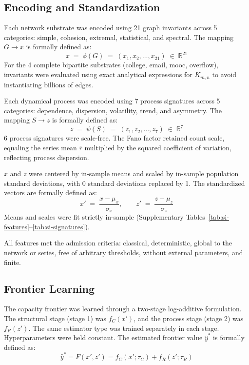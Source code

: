 \documentclass{article}
\begin{document}
\subsection*{Encoding and Standardization}
\label{sec:encoding}
Each network substrate was encoded using 21 graph invariants across 5 categories: simple, cohesion, extremal, statistical, and spectral. The mapping $G \to x$ is formally defined as:
\begin{equation}
    x \;=\; \phi(G) \;=\; (x_1, x_2, \ldots, x_{21}) \;\in\; \mathbb{R}^{21}
\label{eq:invariants}
\end{equation}
For the 4 complete bipartite substrates (college, email, mooc, overflow), invariants were evaluated using exact analytical expressions for $K_{m,n}$ to avoid instantiating billions of edges.

Each dynamical process was encoded using 7 process signatures across 5 categories: dependence, dispersion, volatility, trend, and asymmetry. The mapping $S \to z$ is formally defined as:
\begin{equation}
    z \;=\; \psi(S) \;=\; (z_1, z_2, \ldots, z_7) \;\in\; \mathbb{R}^{7}
\label{eq:signatures}
\end{equation}
6 process signatures were scale-free. The Fano factor retained count scale, equaling the series mean $\bar{r}$ multiplied by the squared coefficient of variation, reflecting process dispersion.

$x$ and $z$ were centered by in-sample means and scaled by in-sample population standard deviations, with 0 standard deviations replaced by 1. The standardized vectors are formally defined as:
\begin{equation}
x' \;=\; \frac{x - \mu_x}{\sigma_x},
\qquad
z' \;=\; \frac{z - \mu_z}{\sigma_z}
\label{eq:standardize}
\end{equation}
Means and scales were fit strictly in-sample (Supplementary Tables~\ref{tab:si-features}--\ref{tab:si-signatures}). 

All features met the admission criteria: classical, deterministic, global to the network or series, free of arbitrary thresholds, without external parameters, and finite.

\subsection*{Frontier Learning}
\label{sec:frontier-learning}
The capacity frontier was learned through a two-stage log-additive formulation. The structural stage (stage 1) was $f_C(x')$, and the process stage (stage 2) was $f_R(z')$. The same estimator type was trained separately in each stage. Hyperparameters were held constant. The estimated frontier value $\widehat{y}^*$ is formally defined as:
\begin{equation}
\widehat{y}^* = F(x', z') = f_C(x'; \tau_C) + f_R(z'; \tau_R)
\label{eq:frontier}
\end{equation}
\end{document}
